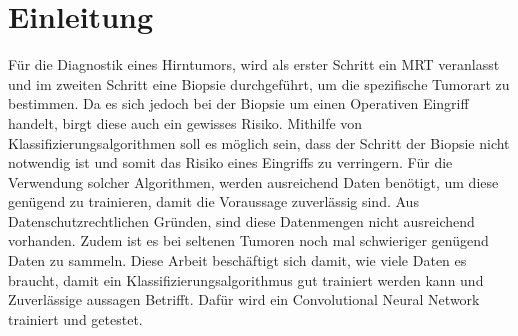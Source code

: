 \chapter{Einleitung}

Für die Diagnostik eines Hirntumors, wird als erster Schritt ein MRT veranlasst und im zweiten Schritt eine Biopsie 
durchgeführt, um die spezifische Tumorart zu bestimmen.
Da es sich jedoch bei der Biopsie um einen Operativen Eingriff handelt, birgt diese auch ein gewisses Risiko.
Mithilfe von Klassifizierungsalgorithmen soll es möglich sein, dass der Schritt der Biopsie nicht notwendig ist 
und somit das Risiko eines Eingriffs  zu verringern.
Für die Verwendung solcher Algorithmen, werden ausreichend Daten benötigt, um diese genügend zu trainieren, damit die 
Voraussage zuverlässig sind. 
Aus Datenschutzrechtlichen Gründen, sind diese Datenmengen nicht ausreichend vorhanden. Zudem ist es bei seltenen
Tumoren noch mal schwieriger genügend Daten zu sammeln.
Diese Arbeit beschäftigt sich damit, wie viele Daten es braucht, damit ein Klassifizierungsalgorithmus gut trainiert werden
kann und Zuverlässige aussagen Betrifft. 
Dafür wird ein Convolutional Neural Network trainiert und getestet.


